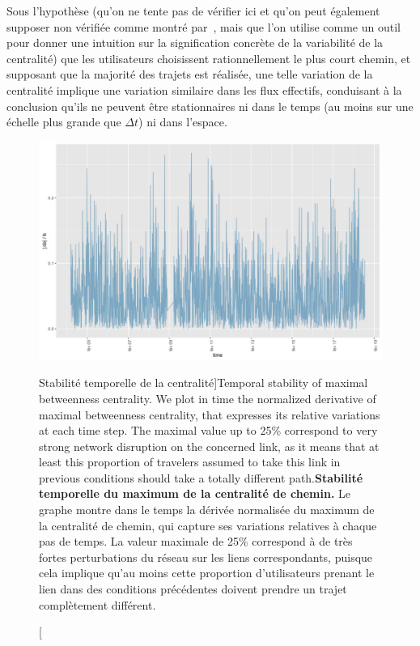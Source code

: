 {Sous l'hypothèse (qu'on ne tente pas de vérifier ici et qu'on peut également supposer non vérifiée comme montré par~\cite{zhu2010people}, mais que l'on utilise comme un outil pour donner une intuition sur la signification concrète de la variabilité de la centralité) que les utilisateurs choisissent rationnellement le plus court chemin, et supposant que la majorité des trajets est réalisée, une telle variation de la centralité implique une variation similaire dans les flux effectifs, conduisant à la conclusion qu'ils ne peuvent être stationnaires ni dans le temps (au moins sur une échelle plus grande que $\Delta t$) ni dans l'espace.
}




\begin{figure}
\includegraphics[width=\linewidth]{Figures/Final/8-1-2-fig-transportationequilibrium-fig-4.jpg}
\caption[Temporal stability of maximal betweenness centrality][Stabilité temporelle de la centralité]{Temporal stability of maximal betweenness centrality. We plot in time the normalized derivative of maximal betweenness centrality, that expresses its relative variations at each time step. The maximal value up to 25\% correspond to very strong network disruption on the concerned link, as it means that at least this proportion of travelers assumed to take this link in previous conditions should take a totally different path.\label{fig:transportationequilibrium:fig-4}}{\textbf{Stabilité temporelle du maximum de la centralité de chemin.} Le graphe montre dans le temps la dérivée normalisée du maximum de la centralité de chemin, qui capture ses variations relatives à chaque pas de temps. La valeur maximale de 25\% correspond à de très fortes perturbations du réseau sur les liens correspondants, puisque cela implique qu'au moins cette proportion d'utilisateurs prenant le lien dans des conditions précédentes doivent prendre un trajet complètement différent.\label{fig:transportationequilibrium:fig-4}}
\end{figure}




